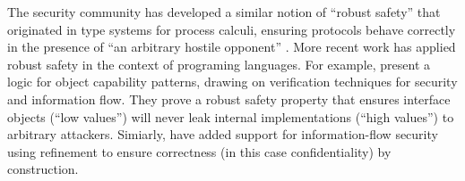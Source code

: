 The security community has developed a similar notion of ``robust safety'' that
originated in type systems for process calculi, ensuring protocols
behave correctly in the presence of ``an arbitrary hostile opponent''
\cite{gordonJefferyRobustSafety,Bugliesi:resource-aware}.  
%
%
%
%
More recent work has applied robust safety in the context of
programing languages.  For example,
\cite{ddd} present a logic
for object capability patterns, drawing 
%
on verification techniques for security and
information flow. They prove a robust safety property that
ensures interface objects (``low values'') 
will never leak internal implementations (``high values'')
to arbitrary attackers.
%
Simiarly, \cite{schaeferCbC} have
added  support for information-flow security %
using refinement to ensure correctness (in this case confidentiality) by
construction. 





